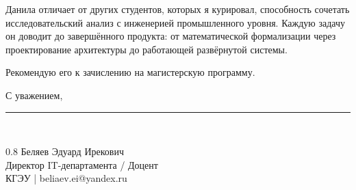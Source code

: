 \documentclass[a4paper,12pt]{article}
\begin{document}
Данила отличает от других студентов, которых я курировал, способность сочетать исследовательский анализ с инженерией промышленного уровня. Каждую задачу он доводит до завершённого продукта: от математической формализации через проектирование архитектуры до работающей развёрнутой системы.

Рекомендую его к зачислению на магистерскую программу.

\vspace{10pt}
\noindent С уважением,

\vspace{15pt}
\rule{5cm}{0.4pt}\\[4pt]
\begin{spacing}{0.8}
  {Беляев Эдуард Ирекович}\\
  {\small Директор IT-департамента / Доцент}\\
  {\small КГЭУ | beliaev.ei@yandex.ru}
\end{spacing}
\end{document}
